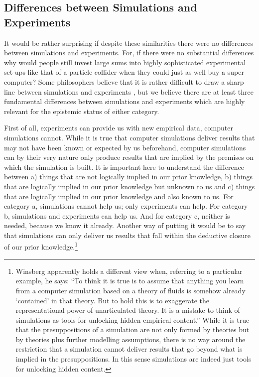 \documentclass[12pt, a4paper]{article}
\numberwithin{equation}{section}
\begin{document}
\subsection{Differences between Simulations and Experiments}
\label{Differences}

It would be rather surprising if despite these similarities there were
no differences between simulations and experiments. For, if there were
no substantial differences why would people still invest large sums
into highly sophisticated experimental set-ups like that of a particle
collider when they could just as well buy a super computer? Some
philosophers believe that it is rather difficult to draw a sharp line
between simulations and experiments \citep{morrison:2009,
  winsberg:2010, parker:2009}, but we believe there are at least three
fundamental differences between simulations and experiments which are
highly relevant for the epistemic status of either category.

First of all, experiments can provide us with new empirical data,
computer simulations cannot. While it is true that computer
simulations deliver results that may not have been known or expected
by us beforehand, computer simulations can by their very nature only
produce results that are implied by the premises on which the
simulation is built. It is important here to understand the difference
between a) things that are not logically implied in our prior
knowledge, b) things that are logically implied in our prior knowledge
but unknown to us and c) things that are logically implied in our
prior knowledge and also known to us. For category a, simulations
cannot help us; only experiments can help. For category b, simulations
and experiments can help us. And for category c, neither is needed,
because we know it already. Another way of putting it would be to say
that simulations can only deliver us results that fall within the
deductive closure of our prior knowledge.\footnote{Winsberg apparently
  holds a different view when, referring to a particular example, he
  says: ``To think it is true is to assume that anything you learn
  from a computer simulation based on a theory of fluids is somehow
  already `contained' in that theory. But to hold this is to
  exaggerate the representational power of unarticulated theory. It is
  a mistake to think of simulations as tools for unlocking hidden
  empirical content.'' \cite[p.  54]{winsberg:2010} While it is true
  that the presuppositions of a simulation are not only formed by
  theories but by theories plus further modelling assumptions, there
  is no way around the restriction that a simulation cannot deliver
  results that go beyond what is implied in the presuppositions. In
  this sense simulations are indeed just tools for unlocking hidden
  content.}
\end{document}
